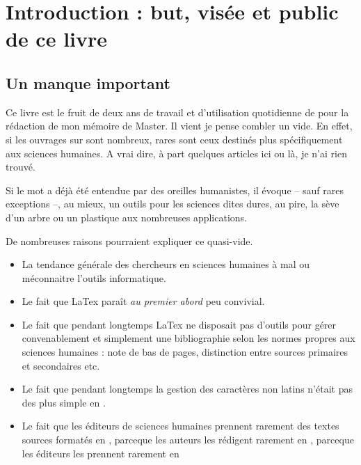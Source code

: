 \chapter{Introduction : but, visée et public de ce livre}
\section{Un manque important}

Ce livre est le fruit de deux ans de travail et d'utilisation quotidienne de  pour la rédaction de mon mémoire de Master. Il vient je pense combler un vide. En effet, si les ouvrages sur  sont nombreux, rares sont ceux destinés plus spécifiquement aux sciences humaines. A vrai dire, à part quelques articles ici ou là, je n'ai rien trouvé.


Si le mot  a déjà été entendue par des oreilles humanistes, il évoque -- sauf rares exceptions --, au mieux, un outils pour les sciences dites dures, au pire, la sève d'un arbre ou un plastique aux nombreuses applications. 

De nombreuses raisons pourraient expliquer ce quasi-vide.
\begin{itemize}
\item La tendance générale des chercheurs en sciences humaines à mal ou méconnaitre l'outils informatique.
\item Le fait que LaTex paraît \emph{au premier abord} peu convivial.
\item Le fait que pendant longtemps LaTex ne disposait pas d'outils pour gérer convenablement et simplement une bibliographie selon les normes propres aux sciences humaines : note de bas de pages, distinction entre sources primaires et secondaires etc.
\item Le fait que pendant longtemps la gestion des caractères non latins n'était pas des plus simple en .
\item Le fait que les éditeurs de sciences humaines prennent rarement des textes sources formatés en , parceque les auteurs les rédigent rarement en , parceque les éditeurs les prennent rarement en 
\end{itemize}

